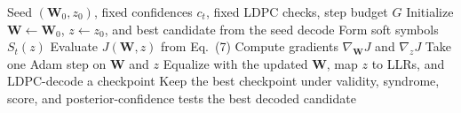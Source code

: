 \documentclass[11pt]{article}
\newcommand{\juna}{JUNA}
\begin{document}
\begin{algorithm}[t]
\caption{\juna{} robust reduced gradient refinement}
\begin{algorithmic}[1]
\Require Seed \((\mathbf W_0,z_0)\), fixed confidences \(c_t\), fixed LDPC checks, step budget \(G\)
\State Initialize \(\mathbf W\gets\mathbf W_0\), \(z\gets z_0\), and best candidate from the seed decode
  \State Form soft symbols \(S_t(z)\)
  \State Evaluate \(J(\mathbf W,z)\) from Eq.~(7)
  \State Compute gradients \(\nabla_{\mathbf W}J\) and \(\nabla_zJ\)
  \State Take one Adam step on \(\mathbf W\) and \(z\)
  \State Equalize with the updated \(\mathbf W\), map \(z\) to LLRs, and LDPC-decode a checkpoint
  \State Keep the best checkpoint under validity, syndrome, score, and posterior-confidence tests
\EndFor
\State \Return the best decoded candidate
\end{algorithmic}
\end{algorithm}
\end{document}
